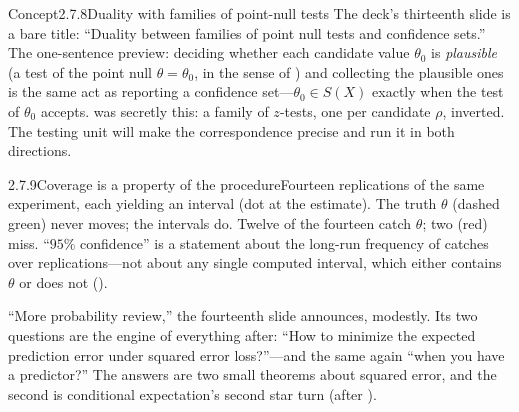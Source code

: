 \documentclass[main.tex]{subfiles}
\begin{document}
\begin{ObjL}{Concept}{2.7.8}{Duality with families of point-null tests}
The deck's thirteenth slide is a bare title: ``Duality between families of point null tests
and confidence sets.'' The one-sentence preview: deciding whether each candidate value
$\theta_0$ is \emph{plausible} (a test of the point null $\theta=\theta_0$, in the sense of
) and collecting the plausible ones is the same act as reporting a confidence
set---$\theta_0\in S(X)$ exactly when the test of $\theta_0$ accepts.  was
secretly this: a family of $z$-tests, one per candidate $\rho$, inverted. The testing unit
will make the correspondence precise and run it in both directions.
\end{ObjL}

\begin{Fig}{2.7.9}{Coverage is a property of the procedure}{Fourteen replications of the
same experiment, each yielding an interval (dot at the estimate). The truth $\theta$ (dashed
green) never moves; the intervals do. Twelve of the fourteen catch $\theta$; two (red) miss.
``$95\%$ confidence'' is a statement about the long-run frequency of catches over
replications---not about any single computed interval, which either contains $\theta$ or
does not ().}
\end{Fig}


``More probability review,'' the fourteenth slide announces, modestly. Its two questions are
the engine of everything after: ``How to minimize the expected prediction error under
squared error loss?''---and the same again ``when you have a predictor?'' The answers are
two small theorems about squared error, and the second is conditional expectation's second
star turn (after ).
\end{document}
